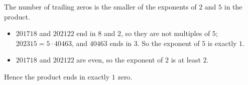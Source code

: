 The number of trailing zeros is the smaller of the exponents of $2$ and $5$ in the product.
\begin{itemize}
\item $201718$ and $202122$ end in $8$ and $2$, so they are not multiples of $5$; $202315=5\cdot40463$, and $40463$ ends in $3$. So the exponent of $5$ is exactly $1$.
\item $201718$ and $202122$ are even, so the exponent of $2$ is at least $2$.
\end{itemize}
Hence the product ends in exactly $\boxed{1}$ zero.
